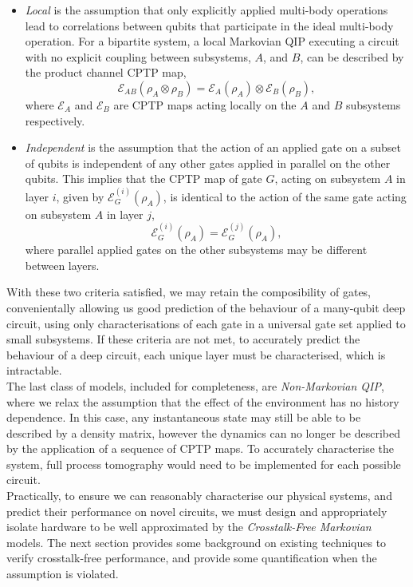 \begin{itemize}
\item\emph{Local} is the assumption that only explicitly applied multi-body operations lead to correlations between qubits that participate in the ideal multi-body operation. For a bipartite system, a local Markovian QIP executing a circuit with no explicit coupling between subsystems, $A$, and $B$, can be described by the product channel CPTP map,
\begin{equation}
    \label{eqn:k-copy_local}
    \mathcal{E}_{AB}(\rho_A\otimes\rho_B) = \mathcal{E}_A(\rho_A)\otimes\mathcal{E}_B(\rho_B),
\end{equation}
where $\mathcal{E}_A$ and $\mathcal{E}_B$ are CPTP maps acting locally on the $A$ and $B$ subsystems respectively.\\
\item\emph{Independent} is the assumption that the action of an applied gate on a
subset of qubits is independent of any other gates applied in parallel on the
other qubits. This implies that the CPTP map of gate $G$, acting on subsystem $A$ in layer $i$, given by $\mathcal{E}_G^{(i)}(\rho_A)$, is identical to the action of the same gate acting on subsystem $A$ in layer $j$, 
\begin{equation}
    \label{eqn:k-copy_independent}
    \mathcal{E}_G^{(i)}(\rho_A)=\mathcal{E}_G^{(j)}(\rho_A),
\end{equation}
where parallel applied gates on the other subsystems may be different between layers.
\end{itemize}
With these two criteria satisfied, we may retain the composibility
of gates, convenientally allowing us good prediction of the behaviour of a
many-qubit deep circuit, using only characterisations of each gate in a
universal gate set applied to small subsystems. If these criteria are not met,
to accurately predict the behaviour of a deep circuit, each unique layer must be
characterised, which is intractable. 
\\
The last class of models, included for completeness, are \emph{Non-Markovian QIP}, where we relax the assumption that the effect of the environment has no history dependence. In this case, any instantaneous state may still be able to be described by a density matrix, however the dynamics can no longer be described by the application of a sequence of CPTP maps. To accurately characterise the system, full process tomography would need to be implemented for each possible circuit. \\ 
Practically, to ensure we can reasonably characterise our physical systems, and predict their performance on novel circuits, we must design and appropriately isolate hardware to be well approximated by the \emph{Crosstalk-Free Markovian} models. The next section provides some background on existing techniques to verify crosstalk-free performance, and provide some quantification when the assumption is violated.


